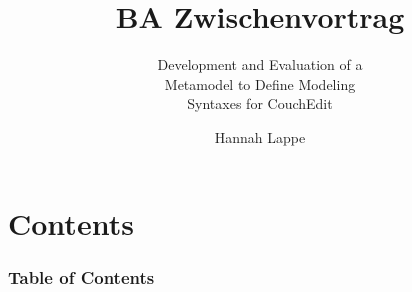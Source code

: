 \documentclass{beamer}
\title{BA Zwischenvortrag}
\subtitle{Development and Evaluation of a\\ Metamodel to Define Modeling \\ Syntaxes for CouchEdit}
\author{Hannah Lappe}
\institute
{\\Institut für Softwaretechnik und \\ Programmiersprachen}
\begin{document}
\hspace*{-1.49cm}
\frame[plain]{\titlepage}

\hspace*{-0.7cm}
\section*{Contents} %
\begin{frame}
  \frametitle{Table of Contents}
  \tableofcontents
\end{frame}






\end{document}
